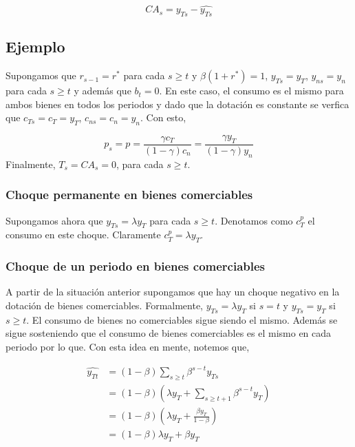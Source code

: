 \documentclass[]{article}
\begin{document}
\[
CA_s = y_{Ts} - \widehat{y_{Ts}}
\]

\subsection{Ejemplo}\label{ejemplo-4}

Supongamos que \(r_{s-1} = r^*\) para cada \(s \geq t\) y
\(\beta(1 + r^*) = 1\), \(y_{Ts} = y_T\), \(y_{ns} = y_n\) para cada
\(s \geq t\) y además que \(b_t = 0\). En este caso, el consumo es el
mismo para ambos bienes en todos los periodos y dado que la dotación es
constante se verfica que \(c_{Ts} = c_T = y_T\), \(c_{ns} = c_n = y_n\).
Con esto,

\[
p_s = p = \frac{\gamma c_T}{(1- \gamma)c_n} = \frac{\gamma y_T}{(1- \gamma)y_n}
\] Finalmente, \(T_s = CA_s = 0\), para cada \(s \geq t\).

\subsubsection{Choque permanente en bienes
comerciables}\label{choque-permanente-en-bienes-comerciables}

Supongamos ahora que \(y_{Ts} = \lambda y_T\) para cada \(s \geq t\).
Denotamos como \(c_T^p\) el consumo en este choque. Claramente
\(c_T^p = \lambda y_T\).

\subsubsection{Choque de un periodo en bienes
comerciables}\label{choque-de-un-periodo-en-bienes-comerciables}

A partir de la situación anterior supongamos que hay un choque negativo
en la dotación de bienes comerciables. Formalmente,
\(y_{Ts} = \lambda y_{T}\) si \(s = t\) y \(y_{Ts} = y_T\) si
\(s \geq t\). El consumo de bienes no comerciables sigue siendo el
mismo. Además se sigue sosteniendo que el consumo de bienes comerciables
es el mismo en cada periodo por lo que. Con esta idea en mente, notemos
que,

\[
\begin{align}
\widehat{y_{Tt}} &= (1-\beta)\sum_{s\geq t}\beta^{s-t}y_{Ts} \\
&= (1-\beta)\left(\lambda y_T + \sum_{s\geq t+1}\beta^{s-t}y_{T}\right) \\
&= (1-\beta)\left(\lambda y_T + \frac{\beta y_{T}}{1-\beta}\right) \\
&= (1-\beta)\lambda y_T + \beta y_T
\end{align}
\]
\end{document}
